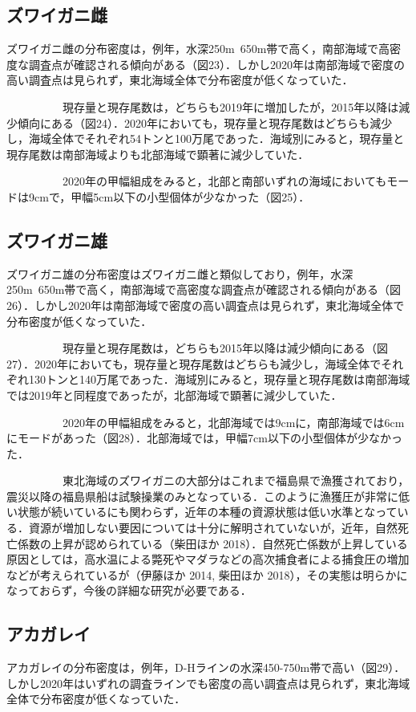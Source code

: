 \documentclass[11pt]{article} %
\begin{document}
\begin{linenumbers}
\subsection{ズワイガニ雌}
ズワイガニ雌の分布密度は，例年，水深250m~650m帯で高く，南部海域で高密度な調査点が確認される傾向がある（図23）．しかし2020年は南部海域で密度の高い調査点は見られず，東北海域全体で分布密度が低くなっていた．

\ \ \ \ \ \ \ \ \ \ 
現存量と現存尾数は，どちらも2019年に増加したが，2015年以降は減少傾向にある（図24）．2020年においても，現存量と現存尾数はどちらも減少し，海域全体でそれぞれ54トンと100万尾であった．海域別にみると，現存量と現存尾数は南部海域よりも北部海域で顕著に減少していた．

\ \ \ \ \ \ \ \ \ \ 
2020年の甲幅組成をみると，北部と南部いずれの海域においてもモードは9cmで，甲幅5cm以下の小型個体が少なかった（図25）．


\subsection{ズワイガニ雄}
ズワイガニ雄の分布密度はズワイガニ雌と類似しており，例年，水深250m~650m帯で高く，南部海域で高密度な調査点が確認される傾向がある（図26）．しかし2020年は南部海域で密度の高い調査点は見られず，東北海域全体で分布密度が低くなっていた．

\ \ \ \ \ \ \ \ \ \ 
現存量と現存尾数は，どちらも2015年以降は減少傾向にある（図27）．2020年においても，現存量と現存尾数はどちらも減少し，海域全体でそれぞれ130トンと140万尾であった．海域別にみると，現存量と現存尾数は南部海域では2019年と同程度であったが，北部海域で顕著に減少していた．

\ \ \ \ \ \ \ \ \ \ 
2020年の甲幅組成をみると，北部海域では9cmに，南部海域では6cmにモードがあった（図28）．北部海域では，甲幅7cm以下の小型個体が少なかった．

\ \ \ \ \ \ \ \ \ \ 
東北海域のズワイガニの大部分はこれまで福島県で漁獲されており，震災以降の福島県船は試験操業のみとなっている．このように漁獲圧が非常に低い状態が続いているにも関わらず，近年の本種の資源状態は低い水準となっている．資源が増加しない要因については十分に解明されていないが，近年，自然死亡係数の上昇が認められている（柴田ほか 2018）．自然死亡係数が上昇している原因としては，高水温による斃死やマダラなどの高次捕食者による捕食圧の増加などが考えられているが（伊藤ほか 2014, 柴田ほか 2018），その実態は明らかになっておらず，今後の詳細な研究が必要である．


\subsection{アカガレイ}
アカガレイの分布密度は，例年，D-Hラインの水深450-750m帯で高い（図29）．しかし2020年はいずれの調査ラインでも密度の高い調査点は見られず，東北海域全体で分布密度が低くなっていた．


\end{linenumbers}
\end{document}

